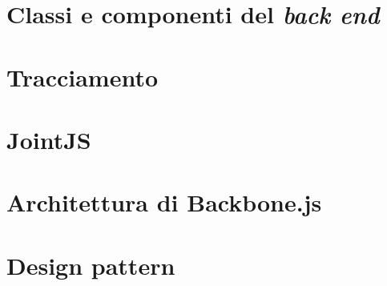 \section{Classi e componenti del \emph{back end}}


% 

\section{Tracciamento}




\appendix

\section{JointJS} \label{sec:app_jointjs}


\section{Architettura di Backbone.js}


\section{Design pattern} \label{sec:app_creaz}



